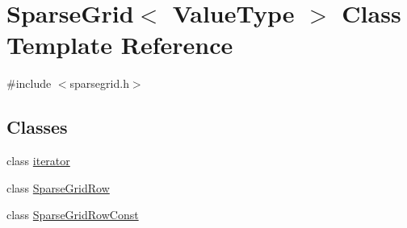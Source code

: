 \hypertarget{classSparseGrid}{}\section{Sparse\+Grid$<$ Value\+Type $>$ Class Template Reference}
\label{classSparseGrid}


{\ttfamily \#include $<$sparsegrid.\+h$>$}

\subsection*{Classes}
\begin{DoxyCompactItemize}
\item 
class \mbox{\hyperlink{classSparseGrid_1_1iterator}{iterator}}
\item 
class \mbox{\hyperlink{classSparseGrid_1_1SparseGridRow}{Sparse\+Grid\+Row}}
\item 
class \mbox{\hyperlink{classSparseGrid_1_1SparseGridRowConst}{Sparse\+Grid\+Row\+Const}}
\end{DoxyCompactItemize}
